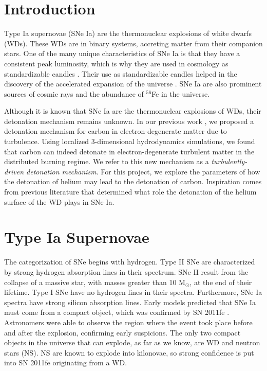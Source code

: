 \documentclass{aastex63}
\begin{document}
\section{Introduction} \label{sec:intro}

Type Ia supernovae (SNe Ia) are the thermonuclear explosions of white dwarfs (WDs). These WDs are in binary systems, accreting matter from their companion stars. One of the many unique characteristics of SNe Ia is that they have a consistent peak luminosity, which is why they are used in cosmology as standardizable candles \cite{phillips93}. Their use as standardizable candles helped in the discovery of the accelerated expansion of the universe \cite{Riess98}. SNe Ia are also prominent sources of cosmic rays and the abundance of $^{56}$Fe in the universe.

Although it is known that SNe Ia are the thermonuclear explosions of WDs, their detonation mechanism remains unknown. In our previous work \cite{Fisher}, we proposed a detonation mechanism for carbon in electron-degenerate matter due to turbulence. Using localized 3-dimensional hydrodynamics simulations, we found that carbon can indeed detonate in electron-degenerate turbulent matter in the distributed burning regime. We refer to this new mechanism as a \textit{turbulently-driven detonation mechanism}. For this project, we explore the parameters of how the detonation of helium may lead to the detonation of carbon. Inspiration comes from previous literature that determined what role the detonation of the helium surface of the WD plays in SNe Ia.

\section{Type Ia Supernovae} \label{sec:style}

The categorization of SNe begins with hydrogen. Type II SNe are characterized by strong hydrogen absorption lines in their spectrum. SNe II result from the collapse of a massive star, with masses greater than 10 M$_{\odot}$, at the end of their lifetime. Type I SNe have no hydrogen lines in their spectra. Furthermore, SNe Ia spectra have strong silicon absorption lines. Early models predicted that SNe Ia must come from a compact object, which was confirmed by SN 2011fe \cite{Nugent_2011}. Astronomers were able to observe the region where the event took place before and after the explosion, confirming early suspicions. The only two compact objects in the universe that can explode, as far as we know, are WD and neutron stars (NS). NS are known to explode into kilonovae, so strong confidence is put into SN 2011fe originating from a WD.
\end{document}
